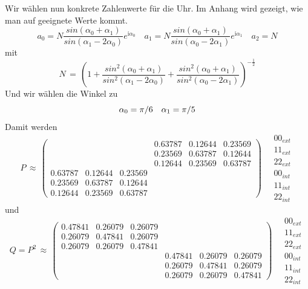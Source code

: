 \documentclass[12pt]{article}
\begin{document}
Wir wählen nun konkrete Zahlenwerte für die Uhr. Im Anhang wird gezeigt, wie man auf geeignete Werte kommt.
\begin{equation*}
a_0=N\frac{sin(\alpha_0+\alpha_1)}{sin(\alpha_1-2\alpha_0)}e^{\mathrm{i}\alpha_0} \quad
a_1=N\frac{sin(\alpha_0+\alpha_1)}{sin(\alpha_0-2\alpha_1)}e^{\mathrm{i}\alpha_1} \quad
a_2=N
\end{equation*}
mit 
\begin{equation*}
N\, = \, \left( 1 +
\frac{sin^2(\alpha_0+\alpha_1)}{sin^2(\alpha_1-2\alpha_0)} +
\frac{sin^2(\alpha_0+\alpha_1)}{sin^2(\alpha_0-2\alpha_1)} \right)^{-\frac{1}{2}}
\end{equation*}
Und wir wählen die Winkel zu
\begin{equation*}
\alpha_0 = \pi / 6 \quad \alpha_1 = \pi / 5 \\ \\
\end{equation*}
Damit werden 
\begin{equation*}
P\, \approx\,
\begin{pmatrix}
   &&& 0.63787 &  0.12644 &  0.23569 \\
   &&& 0.23569 &  0.63787 &  0.12644 \\
   &&& 0.12644 &  0.23569 &  0.63787 \\
   0.63787 &  0.12644 &  0.23569 &&& \\
   0.23569 &  0.63787 &  0.12644 &&& \\
   0.12644 &  0.23569 &  0.63787 &&& 
\end{pmatrix}
\quad
\begin{matrix}
00_{ext} \\ 11_{ext} \\ 22_{ext} \\ 00_{int} \\ 11_{int} \\ 22_{int}
\end{matrix}
\end{equation*}
und
\begin{equation*}
Q=P^2\, \approx\,
\begin{pmatrix}
   0.47841 & 0.26079 & 0.26079 &&& \\
   0.26079 & 0.47841 & 0.26079 &&& \\
   0.26079 & 0.26079 & 0.47841 &&& \\
   &&& 0.47841 & 0.26079 & 0.26079 \\
   &&& 0.26079 & 0.47841 & 0.26079 \\
   &&& 0.26079 & 0.26079 & 0.47841
\end{pmatrix}
\quad
\begin{matrix}
00_{ext} \\ 11_{ext} \\ 22_{ext} \\ 00_{int} \\ 11_{int} \\ 22_{int}
\end{matrix}
\end{equation*}
\end{document}
